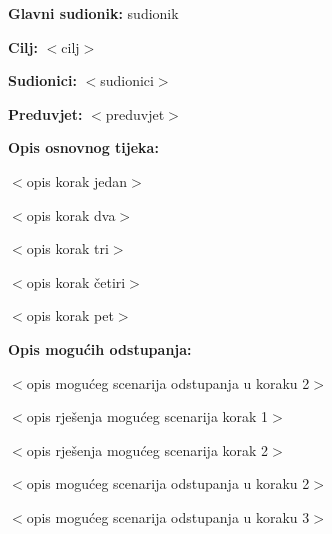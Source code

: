 					\noindent {}
					\begin{packed_item}
						
						\item \textbf{Glavni sudionik: }sudionik
						\item  \textbf{Cilj:} $<$cilj$>$
						\item  \textbf{Sudionici:} $<$sudionici$>$
						\item  \textbf{Preduvjet:} $<$preduvjet$>$
						\item  \textbf{Opis osnovnog tijeka:}
						
						\item[] \begin{packed_enum}
							
							\item $<$opis korak jedan$>$
							\item $<$opis korak dva$>$
							\item $<$opis korak tri$>$
							\item $<$opis korak četiri$>$
							\item $<$opis korak pet$>$
						\end{packed_enum}
						
						\item  \textbf{Opis mogućih odstupanja:}
						
						\item[] \begin{packed_item}
							
							\item[2.a] $<$opis mogućeg scenarija odstupanja u koraku 2$>$
							\item[] \begin{packed_enum}
								
								\item $<$opis rješenja mogućeg scenarija korak 1$>$
								\item $<$opis rješenja mogućeg scenarija korak 2$>$
								
							\end{packed_enum}
							\item[2.b] $<$opis mogućeg scenarija odstupanja u koraku 2$>$
							\item[3.a] $<$opis mogućeg scenarija odstupanja  u koraku 3$>$
							
						\end{packed_item}
					\end{packed_item}
				
